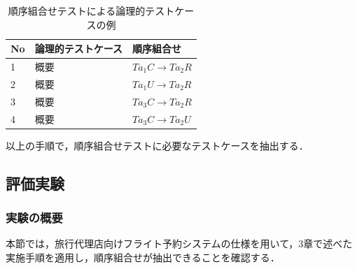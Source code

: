 \documentclass[10pt,a4j]{jarticle}
\begin{document}


\begin{table}[t]
  \centering
  \caption{順序組合せテストによる論理的テストケースの例}
    \begin{tabular}{l|l|l}
    No & 論理的テストケース & 順序組合せ \\
    \hline
    1 & 概要 & $Ta_1C \rightarrow Ta_2R$ \\
    \hline
    2 & 概要 & $Ta_1U \rightarrow Ta_2R$ \\
    \hline
    3 & 概要 & $Ta_3C \rightarrow Ta_2R$ \\
    \hline
    4 & 概要 & $Ta_3C \rightarrow Ta_2U$ \\
    \hline
    \end{tabular}%
\label{TCLISTSAMPLE}
\end{table}%


以上の手順で，順序組合せテストに必要なテストケースを抽出する．

\subsection{評価実験} \label{sec:5-3}
\subsubsection{実験の概要} \label{sec:5-3-1}

本節では，旅行代理店向けフライト予約システムの仕様を用いて，3章で述べた実施手順を適用し，順序組合せが抽出できることを確認する．
\end{document}
